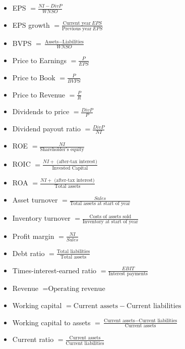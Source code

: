 
\begin{itemize}
    \item EPS $=\frac{NI - DivP}{WNSO}$
    \item EPS growth $=\frac{\text{Current year}~EPS}{\text{Previous year}~EPS}$
    \item BVPS $=\frac{\text{Assets} - \text{Liabilities}}{WNSO}$
    \item Price to Earnings $=\frac{P}  {EPS}$
    \item Price to Book $=\frac{P}{BVPS}$
    \item Price to Revenue $=\frac{P}{R}$
    \item Dividends to price $=\frac{DivP}{P}$
    \item Dividend payout ratio $=\frac{DivP}{NI}$
\end{itemize}

\begin{itemize}
    \item ROE $=\frac{NI}{\text{Shareholder's equity}}$
    \item ROIC $=\frac{NI + \text{ (after-tax interest)}}{\text{Invested Capital}}$
    \item ROA $=\frac{NI + \text{ (after-tax interest)}}{\text{Total assets}}$
\end{itemize}

\begin{itemize}
    \item Asset turnover $=\frac{Sales}{\text{Total assets at start of year}}$
    \item Inventory turnover $=\frac{\text{Costs of assets sold}}{\text{Inventory at start of year}}$
    \item Profit margin $=\frac{NI}{Sales}$
\end{itemize}

\begin{itemize}
    \item Debt ratio $=\frac{\text{Total liabilities}}{\text{Total assets}}$
    \item Times-interest-earned ratio $=\frac{EBIT}{\text{Interest payments}}$
\end{itemize}

\begin{itemize}
    \item Revenue $=\text{Operating revenue}$
    \item Working capital $=\text{Current assets} - \text{Current liabilities}$
    \item Working capital to assets $=\frac{\text{Current assets} - \text{Current liabilities}}{\text{Current assets}}$
    \item Current ratio $=\frac{\text{Current assets}}{\text{Current liabilities}}$
\end{itemize}

